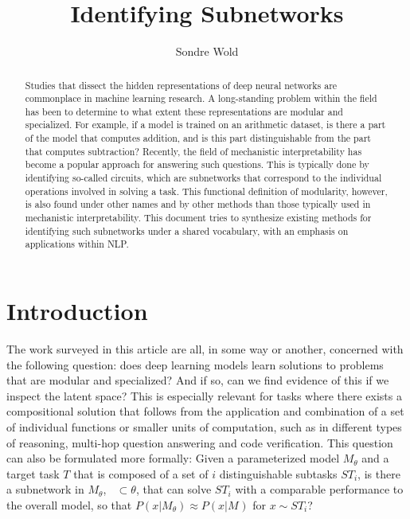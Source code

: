 \documentclass[11pt]{article}
\title{Identifying Subnetworks}
\author{Sondre Wold}
\DeclareMathOperator*{\subnetwork}{\hat{\theta_i}}
\begin{document}
\maketitle

\begin{abstract}
\noindent
Studies that dissect the hidden representations of deep neural networks are commonplace in machine learning research. A long-standing problem within the field has been to determine to what extent these representations are modular and specialized. For example, if a model is trained on an arithmetic dataset, is there a part of the model that computes addition, and is this part  distinguishable from the part that computes subtraction? Recently, the field of mechanistic interpretability has become a popular approach for answering such questions. This is typically done by identifying so-called circuits, which are subnetworks that correspond to the individual operations involved in solving a task. This functional definition of modularity, however, is also found under other names and by other methods than those typically used in mechanistic interpretability. This document tries to synthesize existing methods for identifying such subnetworks under a shared vocabulary, with an emphasis on applications within NLP.
\end{abstract}

\section{Introduction}

The work surveyed in this article are all, in some way or another, concerned with the following question: does deep learning models learn solutions to problems that are modular and specialized? And if so, can we find evidence of this if we inspect the latent space? This is especially relevant for tasks where there exists a compositional solution that follows from the application and combination of a set of individual functions or smaller units of computation, such as in different types of reasoning, multi-hop question answering and code verification. This question can also be formulated more formally: Given a parameterized model $M_\theta$ and a target task $T$ that is composed of a set of $i$ distinguishable subtasks $ST_i$, is there a subnetwork in $M_\theta$, $\subnetwork \subset \theta$, that can solve $ST_i$ with a comparable performance to the overall model, so that $P(x | M_\theta) \approx P(x | M_{\subnetwork})$ for $x \sim ST_i$? 
\end{document}
